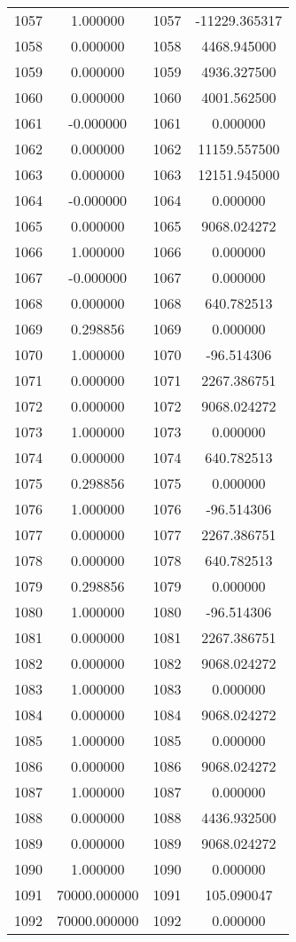 \documentclass[12pt]{article}
\begin{document}
\begin{longtable}{@{}cccc@{}}
1057 & 1.000000 & 1057 & -11229.365317 \\
1058 & 0.000000 & 1058 & 4468.945000 \\
1059 & 0.000000 & 1059 & 4936.327500 \\
1060 & 0.000000 & 1060 & 4001.562500 \\
1061 & -0.000000 & 1061 & 0.000000 \\
1062 & 0.000000 & 1062 & 11159.557500 \\
1063 & 0.000000 & 1063 & 12151.945000 \\
1064 & -0.000000 & 1064 & 0.000000 \\
1065 & 0.000000 & 1065 & 9068.024272 \\
1066 & 1.000000 & 1066 & 0.000000 \\
1067 & -0.000000 & 1067 & 0.000000 \\
1068 & 0.000000 & 1068 & 640.782513 \\
1069 & 0.298856 & 1069 & 0.000000 \\
1070 & 1.000000 & 1070 & -96.514306 \\
1071 & 0.000000 & 1071 & 2267.386751 \\
1072 & 0.000000 & 1072 & 9068.024272 \\
1073 & 1.000000 & 1073 & 0.000000 \\
1074 & 0.000000 & 1074 & 640.782513 \\
1075 & 0.298856 & 1075 & 0.000000 \\
1076 & 1.000000 & 1076 & -96.514306 \\
1077 & 0.000000 & 1077 & 2267.386751 \\
1078 & 0.000000 & 1078 & 640.782513 \\
1079 & 0.298856 & 1079 & 0.000000 \\
1080 & 1.000000 & 1080 & -96.514306 \\
1081 & 0.000000 & 1081 & 2267.386751 \\
1082 & 0.000000 & 1082 & 9068.024272 \\
1083 & 1.000000 & 1083 & 0.000000 \\
1084 & 0.000000 & 1084 & 9068.024272 \\
1085 & 1.000000 & 1085 & 0.000000 \\
1086 & 0.000000 & 1086 & 9068.024272 \\
1087 & 1.000000 & 1087 & 0.000000 \\
1088 & 0.000000 & 1088 & 4436.932500 \\
1089 & 0.000000 & 1089 & 9068.024272 \\
1090 & 1.000000 & 1090 & 0.000000 \\
1091 & 70000.000000 & 1091 & 105.090047 \\
1092 & 70000.000000 & 1092 & 0.000000 \\

\end{longtable}
\end{document}
